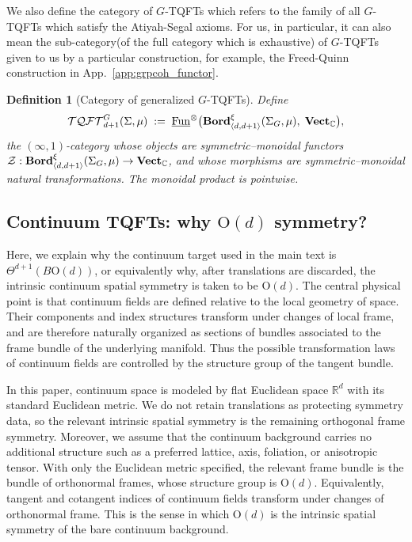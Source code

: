 \documentclass[aps,prx,reprint,superscriptaddress,twocolumn,amsmath,amssymb,amsfonts, nofootinbib]{revtex4-2}
\newcommand{\bordd}{{\bf Bord}_{\langle d, d+1\rangle}}
\newcommand{\vect}{{\bf Vect}_{\mathbb{C}}}
\newcommand{\tqftd}{\mathcal{TQFT}_{d+1}}
\theoremstyle{apsstyle}
\newtheorem{definition}[theorem]{Definition}
\begin{document}
\bigskip 

We also define the category of $G$-TQFTs which refers to the family of all $G$-TQFTs which satisfy the Atiyah-Segal axioms. For us, in particular, it can also mean the sub-category(of the full category which is exhaustive) of $G$-TQFTs given to us by a particular construction, for example, the Freed-Quinn construction in App.~\ref{app:grpcoh_functor}.

\medskip 

\begin{definition}[Category of generalized $G$-TQFTs]
Define
\begin{equation*}
   \tqftd^{G}(\Sigma,\mu)
   \;:=\;
   \underline{\mathrm{Fun}}^{\otimes} 
   \bigl(
      \bordd^{\xi}(\Sigma_G,\mu),\;
      \vect
   \bigr),
\end{equation*}
the $(\infty,1)$-category whose objects are symmetric–monoidal functors
$\mathcal Z:\bordd^{\xi}(\Sigma_G,\mu)\to\vect$, and whose morphisms are symmetric–monoidal
natural transformations. The monoidal product is pointwise.
\end{definition}


\subsection{Continuum TQFTs: why $\mathrm{O}(d)$ symmetry?}
\label{app:why_Od_continuum}

Here, we explain why the continuum target used in the main text is $\Theta^{d+1}(B\mathrm{O}(d))$, or equivalently why, after translations are discarded, the intrinsic continuum spatial symmetry is taken to be $\mathrm{O}(d)$. The central physical point is that continuum fields are defined relative to the local geometry of space. Their components and index structures transform under changes of local frame, and are therefore naturally organized as sections of bundles associated to the frame bundle of the underlying manifold. Thus the possible transformation laws of continuum fields are controlled by the structure group of the tangent bundle.

\medskip 

\noindent In this paper, continuum space is modeled by flat Euclidean space $\mathbb R^{d}$ with its standard Euclidean metric. We do not retain translations as protecting symmetry data, so the relevant intrinsic spatial symmetry is the remaining orthogonal frame symmetry. Moreover, we assume that the continuum background carries no additional structure such as a preferred lattice, axis, foliation, or anisotropic tensor. With only the Euclidean metric specified, the relevant frame bundle is the bundle of orthonormal frames, whose structure group is $\mathrm{O}(d)$. Equivalently, tangent and cotangent indices of continuum fields transform under changes of orthonormal frame. This is the sense in which $\mathrm{O}(d)$ is the intrinsic spatial symmetry of the bare continuum background.
\end{document}
